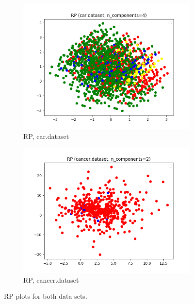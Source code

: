 \documentclass{article}
\begin{document}
\begin{figure}[htb]
        \begin{subfigure}{0.5\textwidth}
          \includegraphics[width=\linewidth]{out/rp/car-rp-comp-4.png}
          \caption{RP, car.dataset}
          \label{fig:rp-plot-car}
        \end{subfigure}\hfil
        \begin{subfigure}{0.5\textwidth}
          \includegraphics[width=\linewidth]{out/rp/cancer-rp-comp-2.png}
          \caption{RP, cancer.dataset}
          \label{fig:rp-plot-cancer}
        \end{subfigure}

      \caption{RP plots for both data sets.}
      \label{fig:rp-plot}
      \end{figure}
\end{document}
